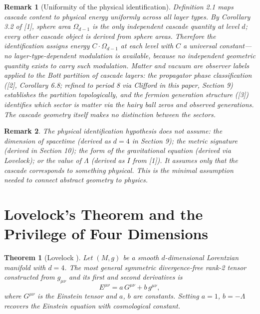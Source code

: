 \documentclass[12pt,a4paper]{article}
\newtheorem{theorem}{Theorem}[section]
\newtheorem*{remark}{Remark}
\begin{document}
\begin{remark}[Uniformity of the physical identification]
Definition 2.1 maps cascade
content to physical energy uniformly across all layer types. By Corollary 3.2 of [1], sphere
area $\Omega_{d-1}$ is the only independent cascade quantity at level $d$; every other cascade object
is derived from sphere areas. Therefore the identification assigns energy $C \cdot \Omega_{d-1}$ at each
level with $C$ a universal constant---no layer-type-dependent modulation is available, because
no independent geometric quantity exists to carry such modulation. Matter and vacuum
are observer labels applied to the Bott partition of cascade layers: the propagator phase
classification ([2], Corollary 6.8; refined to period 8 via Clifford in this paper, Section 9) establishes the partition topologically, and the fermion
generation structure ([3]) identifies which sector is matter via the hairy ball zeros and
observed generations. The cascade geometry itself makes no distinction between the sectors.
\end{remark}

\begin{remark}
The physical identification hypothesis does not assume: the dimension of
spacetime (derived as $d = 4$ in Section 9); the metric signature (derived in Section 10);
the form of the gravitational equation (derived via Lovelock); or the value of $\Lambda$ (derived as
$I$ from [1]). It assumes only that the cascade corresponds to something physical. This is
the minimal assumption needed to connect abstract geometry to physics.
\end{remark}

\section{Lovelock's Theorem and the Privilege of Four Dimensions}\label{sec:lovelock-s-theorem-and-the-privilege-of}

\begin{theorem}[Lovelock {\cite{lovelock1,lovelock2}}]
Let $(M, g)$ be a smooth $d$-dimensional Lorentzian manifold
with $d = 4$. The most general symmetric divergence-free rank-2 tensor constructed from
$g_{\mu\nu}$ and its first and second derivatives is
\[
E^{\mu\nu} = a\,G^{\mu\nu} + b\,g^{\mu\nu},
\]
where $G^{\mu\nu}$ is the Einstein tensor and $a$, $b$ are constants. Setting $a = 1$, $b = -\Lambda$ recovers
the Einstein equation with cosmological constant.
\end{theorem}
\end{document}
